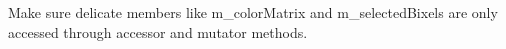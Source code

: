 
\begin{DoxyRefList}
\item[\label{todo1__todo1000001}%
\hypertarget{todo1__todo1000001}{}%
Class \hyperlink{classGLWidget}{G\-L\-Widget} ]Make sure delicate members like m\-\_\-color\-Matrix and m\-\_\-selected\-Bixels are only accessed through accessor and mutator methods. 
\end{DoxyRefList}